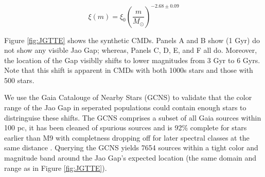 \begin{equation}\label{eqn:IMF}
	\xi(m) = \xi_{0}\left(\frac{m}{M_{\odot}}\right)^{-2.68\pm0.09}
\end{equation}

%
%

Figure \ref{fig:JGTTE} shows the synthetic CMDs. Panels A and B show (1 Gyr) do
not show any visible Jao Gap; whereas, Panels C, D, E, and F all do. Moreover,
the location of the Gap visiblly shifts to lower magnitudes from 3 Gyr to 6
Gyrs. Note that this shift is apparent in CMDs with both 1000s stars and those
with 500 stars. 

We use the Gaia Catalouge of Nearby Stars (GCNS) to validate that the color
range of the Jao Gap in seperated populations could contain enough stars to
distringuise these shifts. The GCNS comprises a subset of all Gaia sources
within 100 pc, it has been cleaned of spurious sources and is 92\% complete for
stars earlier than M9 with completness dropping off for later spectral classes
at the same distance \citep{GaiaCollaboration2021}. Querying the GCNS yields
7654 sources within a tight color and magnitude band around the Jao Gap's
expected location (the same domain and range as in Figure \ref{fig:JGTTE}).

